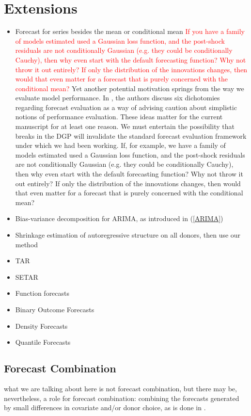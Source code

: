 \documentclass{uiucthesis2021}
\theoremstyle{definition}
\begin{document}
\section{Extensions}\label{Extensions}

\begin{itemize}
  \item Forecast for series besides the mean or conditional mean \textcolor{red}{If you have a family of models estimated used a Gaussian loss function, and the post-shock residuals are not conditionally Gaussian (e.g. they could be conditionally Cauchy), then why even start with the default forecasting function?  Why not throw it out entirely?  If only the distribution of the innovations changes, then would that even matter for a forecast that is purely concerned with the conditional mean?} Yet another potential motivation springs from the way we evaluate model performance.  In \cite{clements2005evaluating}, the authors discuss six dichotomies regarding forecast evaluation as a way of advising caution about simplistic notions of performance evaluation.  These ideas matter for the current manuscript for at least one reason.  We must entertain the possibility that breaks in the DGP will invalidate the standard forecast evaluation framework under which we had been working.  If, for example, we have a family of models estimated used a Gaussian loss function, and the post-shock residuals are not conditionally Gaussian (e.g. they could be conditionally Cauchy), then why even start with the default forecasting function?  Why not throw it out entirely?  If only the distribution of the innovations changes, then would that even matter for a forecast that is purely concerned with the conditional mean?
  \item Bias-variance decomposition for ARIMA, as introduced in (\ref{ARIMA})
  \item Shrinkage estimation of autoregressive structure on all donors, then use our method
  \item TAR
  \item SETAR
  \item Function forecasts
  \item Binary Outcome Forecasts
  \item Density Forecasts
  \item Quantile Forecasts
\end{itemize}

\subsection{Forecast Combination}
what we are talking about here is not forecast combination, but there may be, nevertheless, a role for forecast combination: combining the forecasts generated by small differences in covariate and/or donor choice, as is done in \cite{lundquist2024volatility}. \\
\end{document}
